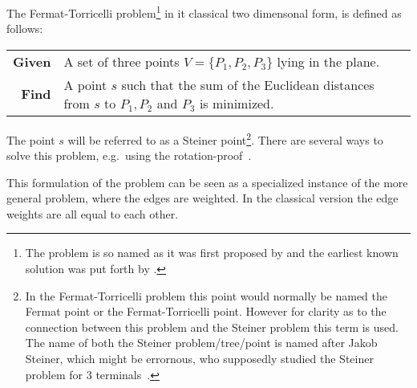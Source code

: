 The Fermat-Torricelli problem\footnote{The problem is so named as it was first
  proposed by \textcite{fermat1891} and the earliest known solution was put
  forth by \textcite{torricelli1919}.} in it classical two dimensonal form, is
defined as follows:
%
\begin{center}
\begin{tabular}{rp{9cm}}
  \toprule
  \textbf{Given} & A set of three points $V = \{P_1, P_2, P_3\}$ lying in the plane. \\
  \textbf{Find}  & A point $s$ such that the sum of the Euclidean distances from
                   $s$ to $P_1, P_2$ and $P_3$ is minimized. \\
  \bottomrule
\end{tabular}
\end{center}
%
The point $s$ will be referred to as a Steiner point\footnote{In the
  Fermat-Torricelli problem this point would normally be named the Fermat point
  or the Fermat-Torricelli point. However for clarity as to the connection
  between this problem and the Steiner problem this term is used. The name of
  both the Steiner problem/tree/point is named after Jakob Steiner, which might
  be errornous, who supposedly studied the Steiner problem for $3$
  terminals~\cite{brazil2014}.}. There are several ways to solve this problem,
e.g.\ using the rotation-proof~\cite[p.~3--5]{brazil2015}.

This formulation of the problem can be seen as a specialized instance of the
more general problem, where the edges are weighted. In the classical version the
edge weights are all equal to each other.

